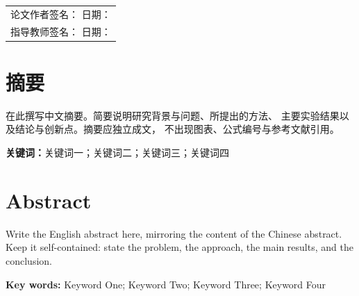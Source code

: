 \documentclass[
  UTF8,
  fontset=fandol,        %
  zihao=-4,              %
  a4paper,
  oneside,               %
]{ctexbook}
\begin{document}
\vspace{4em}
\begin{flushright}
  \begin{tabular}{l}
    论文作者签名：\underline{\hspace{6em}} \quad 日期：\underline{\hspace{6em}} \\[1.2em]
    指导教师签名：\underline{\hspace{6em}} \quad 日期：\underline{\hspace{6em}} \\
  \end{tabular}
\end{flushright}

\chapter*{摘\quad 要}
在此撰写中文摘要。简要说明研究背景与问题、所提出的方法、
主要实验结果以及结论与创新点。摘要应独立成文，
不出现图表、公式编号与参考文献引用。

\vspace{1em}
\noindent\textbf{关键词：}关键词一；关键词二；关键词三；关键词四

\chapter*{Abstract}
Write the English abstract here, mirroring the content of the Chinese
abstract. Keep it self-contained: state the problem, the approach,
the main results, and the conclusion.

\vspace{1em}
\noindent\textbf{Key words:} Keyword One; Keyword Two; Keyword Three; Keyword Four

\tableofcontents




\end{document}

